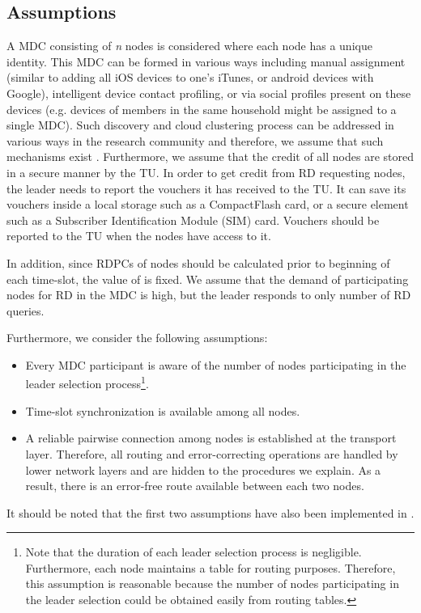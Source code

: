 \documentclass[journal,12pt, onecolumn]{IEEEtran}
\begin{document}
\subsection{Assumptions}\label{section:assumptions}
A MDC consisting of \textit{n} nodes is considered where each node has a unique identity. This MDC can be formed in various ways including manual assignment (similar to adding all iOS devices to one's iTunes, or android devices with Google), intelligent device
contact profiling, or via social profiles present on these devices (e.g. devices of members in the same household might be assigned to a single MDC). Such discovery and cloud clustering process can be addressed in various ways in the research
community \cite{x27} and therefore, we assume that such mechanisms exist \cite{x335}. Furthermore, we assume that the credit of all nodes are stored in a secure manner by the TU. In order to get credit from RD requesting nodes, the leader needs to report the vouchers it has received to the TU. It can save its vouchers inside a local storage such as a CompactFlash card, or a secure element such as a Subscriber Identification Module (SIM) card. Vouchers should be reported to the TU when the nodes have access to it.

In addition, since RDPCs of nodes should be calculated prior to beginning of each time-slot, the value of  is fixed. We assume that the demand of participating nodes for RD in the MDC is high, but the leader responds to only  number of RD queries.

Furthermore, we consider the following assumptions: 
\begin{itemize}
\item Every MDC participant is aware of the number of nodes participating in the leader selection process\footnote[1]{
Note that the duration of each leader selection process is negligible. Furthermore, each node maintains a table for routing purposes. Therefore, this assumption is reasonable because the number of nodes participating in the leader selection could be obtained easily from routing tables.}.
\item Time-slot synchronization is available among all nodes. 
\item A reliable pairwise connection among nodes is established at the transport layer. Therefore, all routing and error-correcting operations are handled by lower network layers and are hidden to the procedures we explain. As a result, there is an error-free route available between each two nodes. 



\end{itemize}
It should be noted that the first two assumptions have also been implemented in \cite{x22}.
\end{document}
